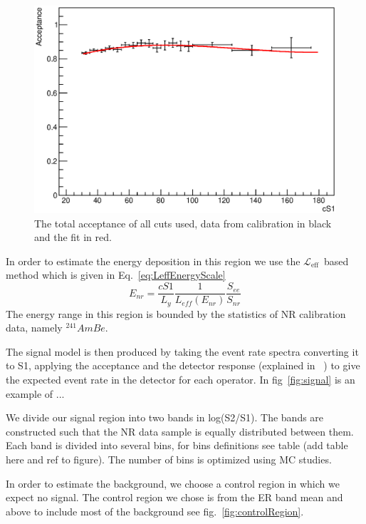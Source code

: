 \documentclass[twocolumn, showpacs, showkeys, amsmath, amssymb, floatfix]{revtex4}
\newcommand \Leff{$\mathcal{L}_{\mathrm{eff}}$}
\begin{document}
\begin{figure}[h!]
\begin{minipage}{1.\linewidth}
\centerline{\includegraphics[width=1.\linewidth]{Figures/Acceptance.eps}}
\end{minipage}
\caption{The total acceptance of all cuts used, data from calibration in black and the fit in red.}
\label{fig:Acc}
\end{figure}

In order to estimate the energy deposition in this region we use the \Leff\ based method which is given in Eq.~\ref{eq:LeffEnergyScale}
\begin{equation}
\label{eq:LeffEnergyScale}
	E_{nr} = \frac{cS1}{L_y} \frac{1}{L_{eff}(E_{nr})} \frac{S_{ee}}{S_{nr}}
\end{equation}
The energy range in this region is bounded by the statistics of NR calibration data, namely $^{241}AmBe$.

The signal model is then produced by taking the event rate spectra converting it to S1, applying the acceptance and the detector response (explained in ~\cite{xe100_ana2012}) to give the expected event rate in the detector for each operator. In fig~\ref{fig:signal} is an example of ...

We divide our signal region into two bands in log(S2/S1). The bands are constructed such that the NR data sample is equally distributed between them. Each band is divided into several bins, for bins definitions see table (add table here and ref to figure). The number of bins is optimized using MC studies.

In order to estimate the background, we choose a control region in which we expect no signal. The control region we chose is from the ER band mean and above to include most of the background see fig.~\ref{fig:controlRegion}.
\end{document}

